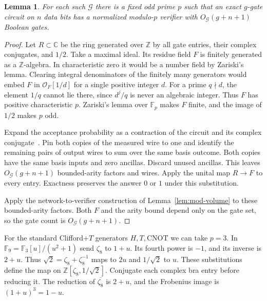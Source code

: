 \documentclass[11pt]{article}
\newtheorem{lemma}[theorem]{Lemma}
\theoremstyle{definition}
\theoremstyle{remark}
\newcommand{\F}{\mathbb{F}}
\begin{document}
\begin{lemma}\label{lem:quantum}
For each such $\mathcal G$ there is a fixed odd prime $p$ such that an
exact $g$-gate circuit on $n$ data bits has a normalized modulo-$p$
verifier with $O_{\mathcal G}(g+n+1)$ Boolean gates.
\end{lemma}
\begin{proof}
Let $R\subset\mathbb C$ be the ring generated over $\mathbb Z$ by all
gate entries, their complex conjugates, and $1/2$. Take a maximal ideal.
Its residue field $F$ is finitely generated as a $\mathbb Z$-algebra.
In characteristic zero it would be a number field by Zariski's lemma.
Clearing integral denominators of the finitely many generators would
embed $F$ in $\mathcal O_F[1/d]$ for a single positive integer $d$.
For a prime $q\nmid d$, the element $1/q$ cannot lie there, since
$d^j/q$ is never an algebraic integer. Thus $F$ has positive
characteristic $p$. Zariski's lemma over $\F_p$ makes $F$ finite,
and the image of $1/2$ makes $p$ odd.

Expand the acceptance probability as a contraction of the circuit
and its complex conjugate~\cite{MarkovShi}. Pin both copies of the
measured wire to one and identify the remaining pairs of output
wires to sum over the same basis outcome. Both copies have the same
basis inputs and zero ancillas. Discard unused ancillas. This leaves
$O_{\mathcal G}(g+n+1)$ bounded-arity factors and wires. Apply the
unital map $R\to F$ to every entry. Exactness preserves the answer
$0$ or $1$ under this substitution.

Apply the network-to-verifier construction of Lemma~\ref{lem:mod-volume}
to these bounded-arity factors. Both $F$ and the arity bound depend
only on the gate set, so the gate count is $O_{\mathcal G}(g+n+1)$.
\end{proof}

For the standard Clifford+$T$ generators $H,T,\mathrm{CNOT}$ we can
take $p=3$. In $\F_9=\F_3[u]/(u^2+1)$ send $\zeta_8$ to $1+u$.
Its fourth power is $-1$, and its inverse is $2+u$. Thus
$\sqrt2=\zeta_8+\zeta_8^{-1}$ maps to $2u$ and $1/\sqrt2$ to $u$.
These substitutions define the map on $\mathbb Z[\zeta_8,1/\sqrt2]$.
Conjugate each complex bra entry before reducing it. The reduction of
$\overline{\zeta_8}$ is $2+u$, and the Frobenius image is $(1+u)^3=1-u$.
\end{document}
